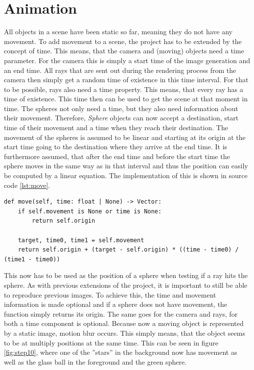\documentclass[12pt]{report}
\begin{document}
\chapter{Animation}
All objects in a scene have been static so far, meaning they do not have any movement. To add movement to a scene, the project has to be extended by the concept of time. This means, that the camera and (moving) objects need a time parameter. For the camera this is simply a start time of the image generation and an end time. All rays that are sent out during the rendering process from the camera then simply get a random time of existence in this time interval. For that to be possible, rays also need a time property. This means, that every ray has a time of existence. This time then can be used to get the scene at that moment in time. The spheres not only need a time, but they also need information about their movement. Therefore, \textit{Sphere} objects can now accept a destination, start time of their movement and a time when they reach their destination. The movement of the spheres is assumed to be linear and starting at its origin at the start time going to the destination where they arrive at the end time. It is furthermore assumed, that after the end time and before the start time the sphere moves in the same way as in that interval and thus the position can easily be computed by a linear equation. The implementation of this is shown in source code \ref{lst:move}.
\begin{lstlisting}[caption={Computing position of sphere}, label=lst:move, style=mystyle]
def move(self, time: float | None) -> Vector:
    if self.movement is None or time is None:
        return self.origin
        
    target, time0, time1 = self.movement
    return self.origin + (target - self.origin) * ((time - time0) / (time1 - time0))
\end{lstlisting}
This now has to be used as the position of a sphere when testing if a ray hits the sphere. As with previous extensions of the project, it is important to still be able to reproduce previous images. To achieve this, the time and movement information is made optional and if a sphere does not have movement, the function simply returns its origin. The same goes for the camera and rays, for both a time component is optional. Because now a moving object is represented by a static image, motion blur occurs. This simply means, that the object seems to be at multiply positions at the same time. This can be seen in figure \ref{fig:step10}, where one of the ''stars'' in the background now has movement as well as the glass ball in the foreground and the green sphere.
\end{document}
